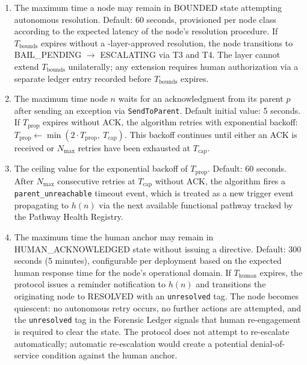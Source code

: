 \begin{enumerate}
\item[\textbf{$T_{\text{bounds}}$ — Bounds Engine resolution timeout.}] The maximum time a node may remain in BOUNDED state attempting autonomous resolution. Default: 60 seconds, provisioned per node class according to the expected latency of the node's resolution procedure. If $T_{\text{bounds}}$ expires without a \fact-layer-approved resolution, the node transitions to BAIL\_PENDING $\rightarrow$ ESCALATING via T3 and T4. The \fact{} layer cannot extend $T_{\text{bounds}}$ unilaterally; any extension requires human authorization via a separate ledger entry recorded before $T_{\text{bounds}}$ expires.

\item[\textbf{$T_{\text{prop}}$ — Per-hop propagation timeout.}] The maximum time node $n$ waits for an acknowledgment from its parent $p$ after sending an exception via \texttt{SendToParent}. Default initial value: 5 seconds. If $T_{\text{prop}}$ expires without ACK, the algorithm retries with exponential backoff: $T_{\text{prop}} \leftarrow \min(2 \cdot T_{\text{prop}},\ T_{\text{cap}})$. This backoff continues until either an ACK is received or $N_{\max}$ retries have been exhausted at $T_{\text{cap}}$.

\item[\textbf{$T_{\text{cap}}$ — Maximum propagation timeout value.}] The ceiling value for the exponential backoff of $T_{\text{prop}}$. Default: 60 seconds. After $N_{\max}$ consecutive retries at $T_{\text{cap}}$ without ACK, the algorithm fires a \texttt{parent\_unreachable} timeout event, which is treated as a new trigger event propagating to $h(n)$ via the next available functional pathway tracked by the Pathway Health Registry.

\item[\textbf{$T_{\text{human}}$ — Human acknowledgment timeout.}] The maximum time the human anchor may remain in HUMAN\_ACKNOWLEDGED state without issuing a directive. Default: 300 seconds (5 minutes), configurable per deployment based on the expected human response time for the node's operational domain. If $T_{\text{human}}$ expires, the protocol issues a reminder notification to $h(n)$ and transitions the originating node to RESOLVED with an \texttt{unresolved} tag. The node becomes quiescent: no autonomous retry occurs, no further actions are attempted, and the \texttt{unresolved} tag in the Forensic Ledger signals that human re-engagement is required to clear the state. The protocol does not attempt to re-escalate automatically; automatic re-escalation would create a potential denial-of-service condition against the human anchor.
\end{enumerate}

